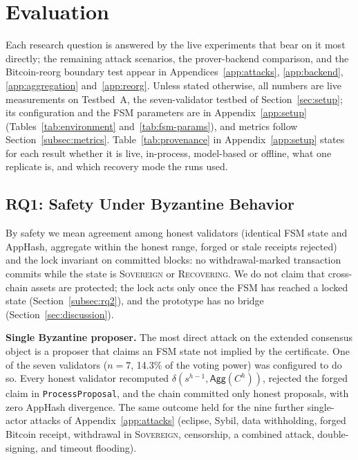\section{Evaluation}
\label{sec:evaluation}

Each research question is answered by the live experiments that bear on it
most directly; the remaining attack scenarios, the prover-backend
comparison, and the Bitcoin-reorg boundary test appear in
Appendices~\ref{app:attacks}, \ref{app:backend}, \ref{app:aggregation} and~\ref{app:reorg}. Unless stated otherwise, all
numbers are live measurements on Testbed~A, the seven-validator testbed of
Section~\ref{sec:setup}; its configuration and the FSM parameters are in
Appendix~\ref{app:setup} (Tables~\ref{tab:environment} and~\ref{tab:fsm-params}), and
metrics follow Section~\ref{subsec:metrics}. Table~\ref{tab:provenance} in Appendix~\ref{app:setup} states for each result whether it is live, in-process, model-based or offline, what one replicate is, and which recovery mode the runs used.

\subsection{RQ1: Safety Under Byzantine Behavior}
\label{subsec:rq1}

By safety we mean agreement among honest validators (identical FSM state and
AppHash, aggregate within the honest range, forged or stale receipts rejected)
and the lock invariant on committed blocks: no withdrawal-marked transaction
commits while the state is \textsc{Sovereign} or \textsc{Recovering}. We do not
claim that cross-chain assets are protected; the lock acts only once the FSM has
reached a locked state (Section~\ref{subsec:rq2}), and the prototype has no bridge
(Section~\ref{sec:discussion}).

\textbf{Single Byzantine proposer.} The most direct attack on the extended
consensus object is a proposer that claims an FSM state not implied by the
certificate. One of the seven validators ($n{=}7$, 14.3\% of the voting
power) was configured to do so. Every honest validator
recomputed $\delta(s^{h-1}, \mathsf{Agg}(C^{h}))$, rejected the forged claim
in \texttt{ProcessProposal}, and the chain committed only honest proposals,
with zero AppHash divergence. The same outcome held for the nine further
single-actor attacks of Appendix~\ref{app:attacks} (eclipse, Sybil, data
withholding, forged Bitcoin receipt, withdrawal in \textsc{Sovereign},
censorship, a combined attack, double-signing, and timeout flooding).

